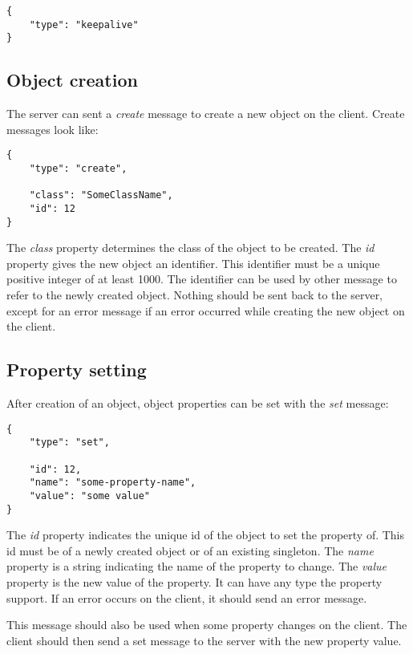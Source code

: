 \documentclass[11pt,a4paper]{article}
\begin{document}
\begin{verbatim}
{
    "type": "keepalive"
}
\end{verbatim}

\subsection{Object creation}

The server can sent a \textit{create} message to create a new object on the client.
Create messages look like:

\begin{verbatim}
{
    "type": "create",
    
    "class": "SomeClassName",
    "id": 12
}
\end{verbatim}

The \textit{class} property determines the class of the object to be created.
The \textit{id} property gives the new object an identifier.
This identifier must be a unique positive integer of at least 1000.
The identifier can be used by other message to refer to the newly created object.
Nothing should be sent back to the server, except for an error message if an error occurred while creating the new object on the client.

\subsection{Property setting}

After creation of an object, object properties can be set with the \textit{set} message:

\begin{verbatim}
{
    "type": "set",
    
    "id": 12,
    "name": "some-property-name",
    "value": "some value"
}
\end{verbatim}

The \textit{id} property indicates the unique id of the object to set the property of.
This id must be of a newly created object or of an existing singleton.
The \textit{name} property is a string indicating the name of the property to change.
The \textit{value} property is the new value of the property.
It can have any type the property support.
If an error occurs on the client, it should send an error message.

This message should also be used when some property changes on the client.
The client should then send a set message to the server with the new property value.
\end{document}

